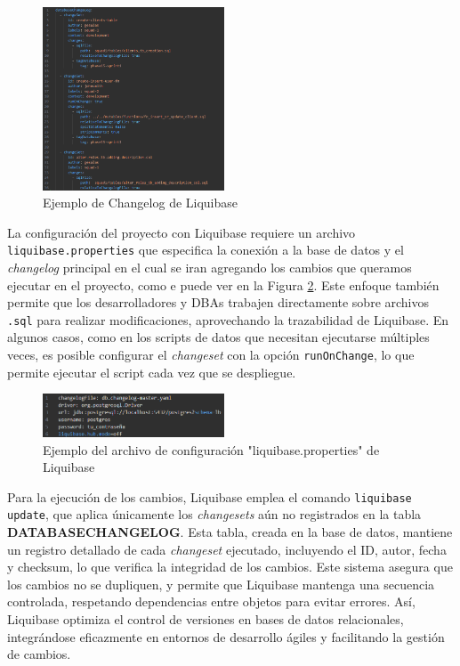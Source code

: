 \documentclass{IEEEtran}
\begin{document}
\begin{figure}[H]
    \centering
    \includegraphics[width=0.48\textwidth]{images/changelogExample.png}
    \caption{Ejemplo de Changelog de Liquibase}
    \label{fig:changelogFig}
\end{figure}

La configuración del proyecto con Liquibase requiere un archivo \texttt{liquibase.properties} que especifica la conexión a la base de datos y el \textit{changelog} principal en el cual se iran agregando los cambios que queramos ejecutar en el proyecto, como e puede ver en la Figura \ref{fig:liquibasePropertiesExample}. Este enfoque también permite que los desarrolladores y DBAs trabajen directamente sobre archivos \texttt{.sql} para realizar modificaciones, aprovechando la trazabilidad de Liquibase. En algunos casos, como en los scripts de datos que necesitan ejecutarse múltiples veces, es posible configurar el \textit{changeset} con la opción \texttt{runOnChange}, lo que permite ejecutar el script cada vez que se despliegue.

\begin{figure}[H]
    \centering
    \includegraphics[width=0.48\textwidth]{images/liquibasePropertiesExample.png}
    \caption{Ejemplo del archivo de configuración "liquibase.properties" de Liquibase}
    \label{fig:liquibasePropertiesExample}
\end{figure}

Para la ejecución de los cambios, Liquibase emplea el comando \texttt{liquibase update}, que aplica únicamente los \textit{changesets} aún no registrados en la tabla \textbf{DATABASECHANGELOG}. Esta tabla, creada en la base de datos, mantiene un registro detallado de cada \textit{changeset} ejecutado, incluyendo el ID, autor, fecha y checksum, lo que verifica la integridad de los cambios. Este sistema asegura que los cambios no se dupliquen, y permite que Liquibase mantenga una secuencia controlada, respetando dependencias entre objetos para evitar errores. Así, Liquibase optimiza el control de versiones en bases de datos relacionales, integrándose eficazmente en entornos de desarrollo ágiles y facilitando la gestión de cambios.\\
\end{document}
